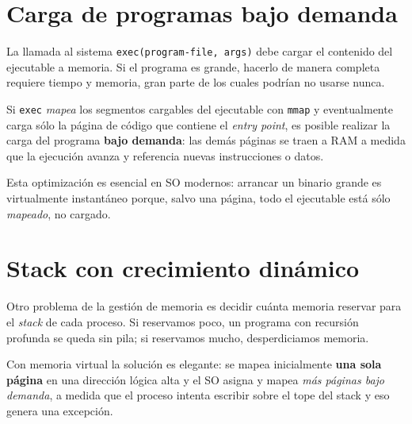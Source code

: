 \documentclass[11pt,a4paper]{article}
\begin{document}
\section{Carga de programas bajo demanda}

La llamada al sistema \texttt{exec(program-file, args)} debe cargar el
contenido del ejecutable a memoria. Si el programa es grande, hacerlo
de manera completa requiere tiempo y memoria, gran parte de los cuales
podrían no usarse nunca.

\begin{idea}
Si \texttt{exec} \emph{mapea} los segmentos cargables del ejecutable
con \texttt{mmap} y eventualmente carga sólo la página de código que
contiene el \emph{entry point}, es posible realizar la carga del
programa \textbf{bajo demanda}: las demás páginas se traen a RAM a
medida que la ejecución avanza y referencia nuevas instrucciones o
datos.
\end{idea}

Esta optimización es esencial en SO modernos: arrancar un binario
grande es virtualmente instantáneo porque, salvo una página, todo el
ejecutable está sólo \emph{mapeado}, no cargado.

\section{Stack con crecimiento dinámico}

Otro problema de la gestión de memoria es decidir cuánta memoria
reservar para el \emph{stack} de cada proceso. Si reservamos poco, un
programa con recursión profunda se queda sin pila; si reservamos
mucho, desperdiciamos memoria.

Con memoria virtual la solución es elegante: se mapea inicialmente
\textbf{una sola página} en una dirección lógica alta y el SO asigna y
mapea \emph{más páginas bajo demanda}, a medida que el proceso intenta
escribir sobre el tope del stack y eso genera una excepción.
\end{document}
